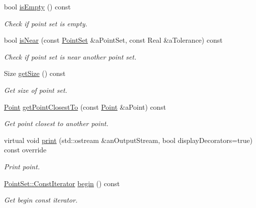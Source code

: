 \begin{DoxyCompactItemize}
bool \hyperlink{classlibrary_1_1math_1_1geom_1_1d3_1_1objects_1_1_point_set_a1bffbfee716ad81a0a475fa2f7d69f9b}{is\+Empty} () const
\begin{DoxyCompactList}\small\item\em Check if point set is empty. \end{DoxyCompactList}\item 
bool \hyperlink{classlibrary_1_1math_1_1geom_1_1d3_1_1objects_1_1_point_set_acffd730ba7d03b3d1e662fa9cdc61813}{is\+Near} (const \hyperlink{classlibrary_1_1math_1_1geom_1_1d3_1_1objects_1_1_point_set}{Point\+Set} \&a\+Point\+Set, const Real \&a\+Tolerance) const
\begin{DoxyCompactList}\small\item\em Check if point set is near another point set. \end{DoxyCompactList}\item 
Size \hyperlink{classlibrary_1_1math_1_1geom_1_1d3_1_1objects_1_1_point_set_ae112a693107884e5d227bfb99f684fea}{get\+Size} () const
\begin{DoxyCompactList}\small\item\em Get size of point set. \end{DoxyCompactList}\item 
\hyperlink{classlibrary_1_1math_1_1geom_1_1d3_1_1objects_1_1_point}{Point} \hyperlink{classlibrary_1_1math_1_1geom_1_1d3_1_1objects_1_1_point_set_a0f2fa4053eec2d5c82cc5b72fb59f1e1}{get\+Point\+Closest\+To} (const \hyperlink{classlibrary_1_1math_1_1geom_1_1d3_1_1objects_1_1_point}{Point} \&a\+Point) const
\begin{DoxyCompactList}\small\item\em Get point closest to another point. \end{DoxyCompactList}\item 
virtual void \hyperlink{classlibrary_1_1math_1_1geom_1_1d3_1_1objects_1_1_point_set_ab1a24422b85249c21feb603025140c1a}{print} (std\+::ostream \&an\+Output\+Stream, bool display\+Decorators=true) const override
\begin{DoxyCompactList}\small\item\em Print point. \end{DoxyCompactList}\item 
\hyperlink{classlibrary_1_1math_1_1geom_1_1d3_1_1objects_1_1_point_set_a7b7fade95484b653ec27ad082ffc8064}{Point\+Set\+::\+Const\+Iterator} \hyperlink{classlibrary_1_1math_1_1geom_1_1d3_1_1objects_1_1_point_set_af81fd640cf4b1804c7c456ce4dbcf2ab}{begin} () const
\begin{DoxyCompactList}\small\item\em Get begin const iterator. \end{DoxyCompactList}\item 

\end{DoxyCompactItemize}
